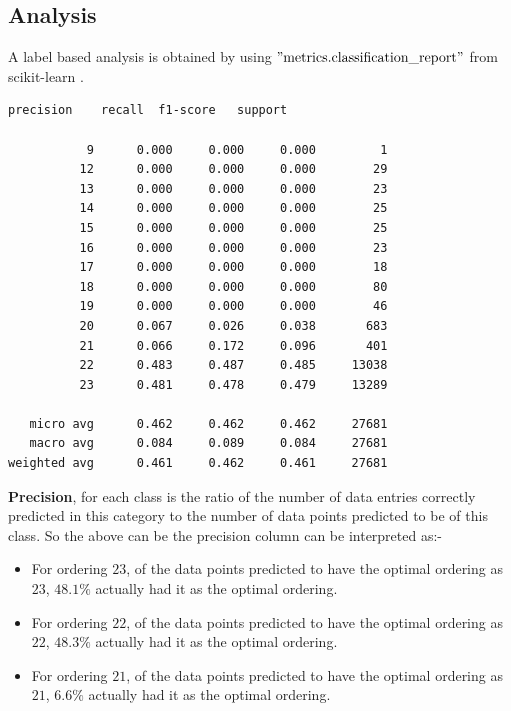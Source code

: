 \subsection{Analysis}
A label based analysis is obtained by using $"\text{metrics.classification\_report}"$ from scikit-learn \cite{scikit-learn}.\\
\begin{lstlisting}[caption=Statistics for various orderings]
             precision    recall  f1-score   support

           9      0.000     0.000     0.000         1
          12      0.000     0.000     0.000        29
          13      0.000     0.000     0.000        23
          14      0.000     0.000     0.000        25
          15      0.000     0.000     0.000        25
          16      0.000     0.000     0.000        23
          17      0.000     0.000     0.000        18
          18      0.000     0.000     0.000        80
          19      0.000     0.000     0.000        46
          20      0.067     0.026     0.038       683
          21      0.066     0.172     0.096       401
          22      0.483     0.487     0.485     13038
          23      0.481     0.478     0.479     13289

   micro avg      0.462     0.462     0.462     27681
   macro avg      0.084     0.089     0.084     27681
weighted avg      0.461     0.462     0.461     27681
\end{lstlisting}
\textbf{Precision}, for each class is the ratio of the number of data entries correctly predicted in this category to the number of data points predicted to be of this class. So the above can be the precision column can be interpreted as:-
\begin{itemize}
    \item For ordering $23$, of the data points predicted to have the optimal ordering as $23$, $48.1\%$ actually had it as the optimal ordering.
    \item For ordering $22$, of the data points predicted to have the optimal ordering as $22$, $48.3\%$ actually had it as the optimal ordering.
    \item For ordering $21$, of the data points predicted to have the optimal ordering as $21$, $6.6\%$ actually had it as the optimal ordering.
\end{itemize} 

